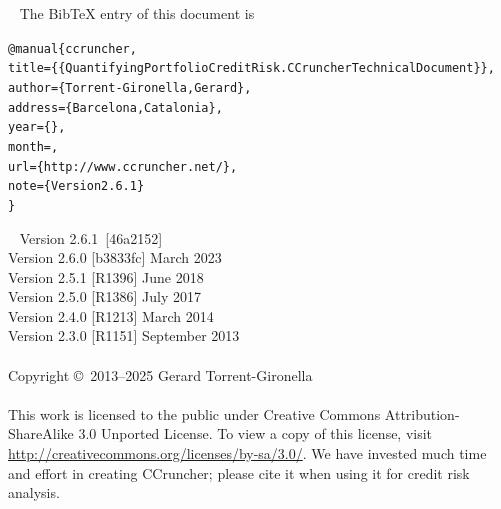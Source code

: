 \documentclass[11pt,fleqn]{book} %
\def\numversion{2.6.1}
\def\gitrev{46a2152}
\begin{document}
~\vfill
The BibTeX entry of this document is
\begin{alltt}
@manual\{ccruncher,
    title = \{\{Quantifying Portfolio Credit Risk. CCruncher Technical Document\}\},
    author = \{Torrent-Gironella, Gerard\},
    address = \{Barcelona, Catalonia\},
    year = \{\the\year\}, 
    month = \shortmonthname,
    url = \{http://www.ccruncher.net/\},
    note = \{Version \numversion\}
\}
\end{alltt}

~\vfill
\thispagestyle{empty}
\noindent Version \numversion\ [\gitrev] \monthname\ \the\year\\ 
\noindent Version 2.6.0 [b3833fc] March 2023\\ 
\noindent Version 2.5.1 [R1396] June 2018\\ 
\noindent Version 2.5.0 [R1386] July 2017\\ 
\noindent Version 2.4.0 [R1213] March 2014\\ 
\noindent Version 2.3.0 [R1151] September 2013\\ 
\\
\noindent Copyright \copyright\ 2013--2025 Gerard Torrent-Gironella\\
\\
\noindent 
This work is licensed to the public under Creative Commons 
Attribution-ShareAlike 3.0 Unported License. To view a copy 
of this license, visit 
\url{http://creativecommons.org/licenses/by-sa/3.0/}.
We have invested much time and effort in creating CCruncher; 
please cite it when using it for credit risk analysis.


\pagestyle{empty}
\setcounter{tocdepth}{1}
\tableofcontents
\end{document}
